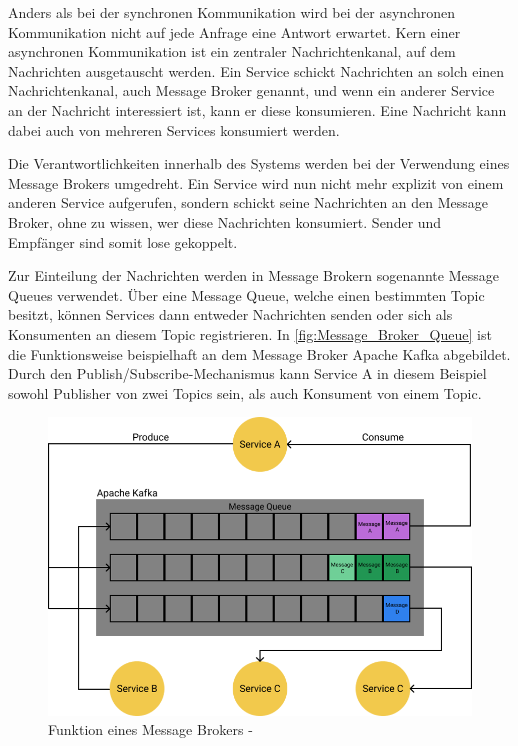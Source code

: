 Anders als bei der synchronen Kommunikation wird bei der asynchronen Kommunikation nicht auf jede Anfrage eine Antwort erwartet. Kern einer asynchronen Kommunikation ist ein zentraler Nachrichtenkanal, auf dem Nachrichten ausgetauscht werden. Ein Service schickt Nachrichten an solch einen Nachrichtenkanal, auch Message Broker genannt, und wenn ein anderer Service an der Nachricht interessiert ist, kann er diese konsumieren. Eine Nachricht kann dabei auch von mehreren Services konsumiert werden.


Die Verantwortlichkeiten innerhalb des Systems werden bei der Verwendung eines Message Brokers umgedreht. Ein Service wird nun nicht mehr explizit von einem anderen Service aufgerufen, sondern schickt seine Nachrichten an den Message Broker, ohne zu wissen, wer diese Nachrichten konsumiert. Sender und Empfänger sind somit lose gekoppelt.

Zur Einteilung der Nachrichten werden in Message Brokern sogenannte Message Queues verwendet. Über eine Message Queue, welche einen bestimmten Topic besitzt, können Services dann entweder Nachrichten senden oder sich als Konsumenten an diesem Topic registrieren. In \autoref{fig:Message_Broker_Queue} ist die Funktionsweise beispielhaft an dem Message Broker \glqq Apache Kafka\grqq{} abgebildet. Durch den Publish/Subscribe-Mechanismus kann Service A in diesem Beispiel sowohl Publisher von zwei Topics sein, als auch Konsument von einem Topic.

\begin{figure}[H]
    \centering
    \includegraphics[width=0.65\linewidth]{images/apache-kafka.png}
    \caption{Funktion eines Message Brokers - \cite{MichaelSchwab.2019}}
    \label{fig:Message_Broker_Queue}
\end{figure}

